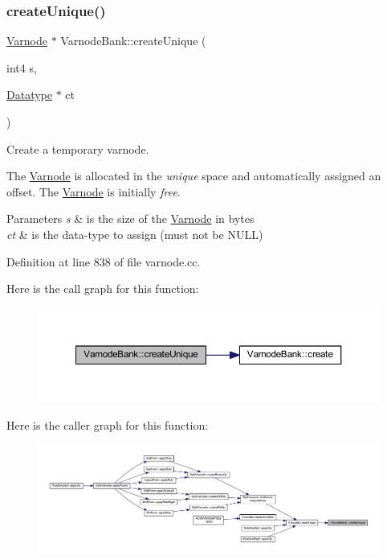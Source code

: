 \subsubsection{\texorpdfstring{createUnique()}{createUnique()}}
{\footnotesize\ttfamily \mbox{\hyperlink{class_varnode}{Varnode}} $\ast$ Varnode\+Bank\+::create\+Unique (\begin{DoxyParamCaption}\item[{int4}]{s,  }\item[{\mbox{\hyperlink{class_datatype}{Datatype}} $\ast$}]{ct }\end{DoxyParamCaption})}



Create a temporary varnode. 

The \mbox{\hyperlink{class_varnode}{Varnode}} is allocated in the {\itshape unique} space and automatically assigned an offset. The \mbox{\hyperlink{class_varnode}{Varnode}} is initially {\itshape free}. 
\begin{DoxyParams}{Parameters}
{\em s} & is the size of the \mbox{\hyperlink{class_varnode}{Varnode}} in bytes \\
\hline
{\em ct} & is the data-\/type to assign (must not be N\+U\+LL) \\
\hline
\end{DoxyParams}


Definition at line 838 of file varnode.\+cc.

Here is the call graph for this function\+:
\nopagebreak
\begin{figure}[H]
\begin{center}
\leavevmode
\includegraphics[width=350pt]{class_varnode_bank_ab73cb940a84d7cb07870f4cb50c66fb1_cgraph}
\end{center}
\end{figure}
Here is the caller graph for this function\+:
\nopagebreak
\begin{figure}[H]
\begin{center}
\leavevmode
\includegraphics[width=350pt]{class_varnode_bank_ab73cb940a84d7cb07870f4cb50c66fb1_icgraph}
\end{center}
\end{figure}
\mbox{\label{class_varnode_bank_abec625ab3cf6d593cf8edc7955e5a414}} 
